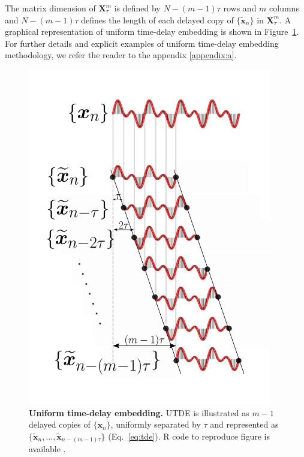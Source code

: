 The matrix dimension of $ \boldsymbol{X}_{\tau}^{m} $ is defined by
$N-(m-1)\tau$ rows and $m$ columns and 
$N-(m-1)\tau$ defines the length of each delayed copy 
of $\{ \boldsymbol{ \tilde{x} }_n \}$ in $\boldsymbol{X}^{m}_{\tau}$.
A graphical representation of uniform time-delay embedding is shown in Figure~\ref{fig:utde}.
For further details and explicit examples of uniform time-delay embedding methodology,
we refer the reader to the appendix \ref{appendix:a}.
\begin{figure}
 \centering
   \includegraphics[width=0.95\textwidth]{utde}
   \caption{
	{\bf Uniform time-delay embedding.} 
	UTDE is illustrated as $m-1$ delayed copies
   of $\{ \boldsymbol{x}_n \}$, uniformly separated by $\tau$ and represented as
   $\{ \boldsymbol{ \tilde{x} }_n, \dots,  \boldsymbol{ \tilde{x} }_{n -(m-1)\tau}   \}$ (Eq.~\ref{eq:tde}).
	R code to reproduce figure is available \cite{hwum2018}.
   }
   \label{fig:utde}
\end{figure}


